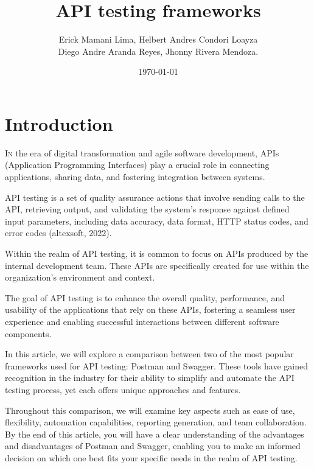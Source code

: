 \documentclass[twoside,twocolumn]{article}
\title{API testing frameworks}
\author{Erick Mamani Lima, Helbert Andres Condori Loayza \\
Diego Andre Aranda Reyes, Jhonny Rivera Mendoza. }
\date{\today}
\begin{document}
\maketitle

\section{Introduction}
\lettrine[lines=3]{I}n the era of digital transformation and agile software development, APIs (Application Programming Interfaces) play a crucial role in connecting applications, sharing data, and fostering integration between systems.


API testing is a set of quality assurance actions that involve sending calls to the API, retrieving output, and validating the system's response against defined input parameters, including data accuracy, data format, HTTP status codes, and error codes (altexsoft, 2022).


Within the realm of API testing, it is common to focus on APIs produced by the internal development team. These APIs are specifically created for use within the organization's environment and context. 

The goal of API testing is to enhance the overall quality, performance, and usability of the applications that rely on these APIs, fostering a seamless user experience and enabling successful interactions between different software components. 

In this article, we will explore a comparison between two of the most popular frameworks used for API testing: Postman and Swagger. These tools have gained recognition in the industry for their ability to simplify and automate the API testing process, yet each offers unique approaches and features.

Throughout this comparison, we will examine key aspects such as ease of use, flexibility, automation capabilities, reporting generation, and team collaboration. By the end of this article, you will have a clear understanding of the advantages and disadvantages of Postman and Swagger, enabling you to make an informed decision on which one best fits your specific needs in the realm of API testing.
\end{document}
